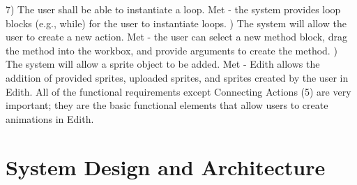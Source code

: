 \documentclass[a4paper]{article}
\begin{document}
7) The user shall be able to instantiate a loop. Met - the system provides loop blocks (e.g., while) for the user to instantiate loops. \newline {}) The system will allow the user to create a new action. Met - the user can select a new method block, drag the method into the workbox, and provide arguments to create the method. \newline {}) The system will allow a sprite object to be added. Met - Edith allows the addition of provided sprites, uploaded sprites, and sprites created by the user in Edith. \newline \newline
All of the functional requirements except Connecting Actions (5) are very important; they are the basic functional elements that allow users to create animations in Edith. 
\section{System Design and Architecture}
\end{document}
